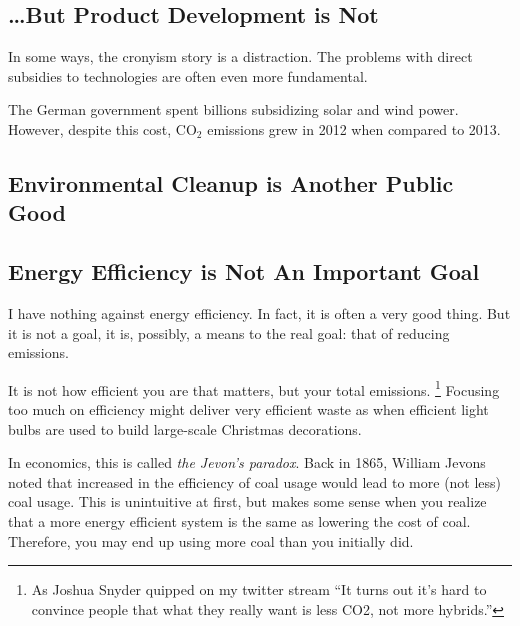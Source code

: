 \subsection{\ldots But Product Development is Not}

In some ways, the cronyism story is a distraction. The problems with direct
subsidies to technologies are often even more fundamental.

The German government spent billions subsidizing solar and wind power. However,
despite this cost, CO${}_2$ emissions grew in 2012 when compared to
2013.

\subsection{Environmental Cleanup is Another Public Good}

\subsection{Energy Efficiency is Not An Important Goal}

I have nothing against energy efficiency. In fact, it is often a very good
thing. But it is not a goal, it is, possibly, a means to the real goal: that of
reducing emissions.

It is not how efficient you are that matters, but your total emissions.
\footnote{As Joshua Snyder quipped on my twitter stream ``It turns out it's
hard to convince people that what they really want is less CO2, not more
hybrids.''
} Focusing too much on efficiency might deliver very efficient waste as when
efficient light bulbs are used to build large-scale Christmas
decorations.

In economics, this is called \emph{the Jevon's paradox}. Back in 1865, William
Jevons noted that increased in the efficiency of coal usage would lead to more
(not less) coal usage. This is unintuitive at first, but makes some sense when
you realize that a more energy efficient system is the same as lowering the
cost of coal. Therefore, you may end up using more coal than you initially did.

